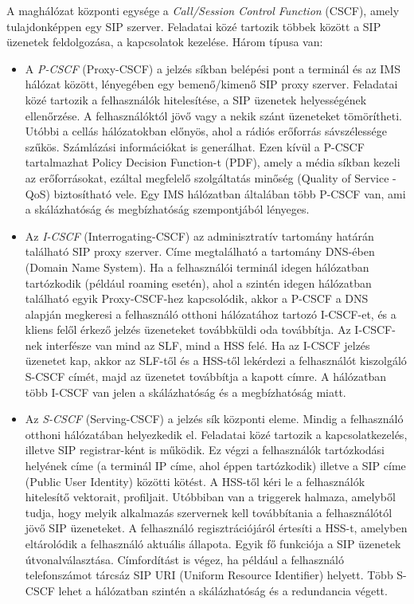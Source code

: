 A maghálózat központi egysége a \emph{Call/Session Control Function} (CSCF), amely tulajdonképpen egy SIP szerver. Feladatai közé tartozik többek között a SIP üzenetek feldolgozása, a kapcsolatok kezelése. Három típusa van:
\begin{itemize}
\item A \emph{P-CSCF} (Proxy-CSCF) a jelzés síkban belépési pont a terminál és az IMS hálózat között, lényegében egy bemenő/kimenő SIP proxy szerver. Feladatai közé tartozik a felhasználók hitelesítése, a SIP üzenetek helyességének ellenőrzése. A felhasználóktól jövő vagy a nekik szánt üzeneteket tömörítheti. Utóbbi a cellás hálózatokban előnyös, ahol a rádiós erőforrás sávszélessége szűkös. Számlázási információkat is generálhat. Ezen kívül a P-CSCF tartalmazhat Policy Decision Function-t (PDF), amely a média síkban kezeli az erőforrásokat, ezáltal megfelelő szolgáltatás minőség (Quality of Service - QoS) biztosítható vele. Egy IMS hálózatban általában több P-CSCF van, ami a skálázhatóság és megbízhatóság szempontjából lényeges.
\item Az \emph{I-CSCF} (Interrogating-CSCF) az adminisztratív tartomány határán található SIP proxy szerver. Címe megtalálható a tartomány DNS-ében (Domain Name System). Ha a felhasználói terminál idegen hálózatban tartózkodik (például roaming esetén), ahol a szintén idegen hálózatban található egyik Proxy-CSCF-hez kapcsolódik, akkor a P-CSCF a DNS alapján megkeresi a felhasználó otthoni hálózatához tartozó I-CSCF-et, és a kliens felől érkező jelzés üzeneteket továbbküldi oda továbbítja. Az I-CSCF-nek interfésze van mind az SLF, mind a HSS felé. Ha az I-CSCF jelzés üzenetet kap, akkor az SLF-től és a HSS-től lekérdezi a felhasználót kiszolgáló S-CSCF címét, majd az üzenetet továbbítja a kapott címre. A hálózatban több I-CSCF van jelen a skálázhatóság és a megbízhatóság miatt.
\item Az \emph{S-CSCF} (Serving-CSCF) a jelzés sík központi eleme. Mindig a felhasználó otthoni hálózatában helyezkedik el. Feladatai közé tartozik a kapcsolatkezelés, illetve SIP registrar-ként is működik. Ez végzi a felhasználók tartózkodási helyének címe (a terminál IP címe, ahol éppen tartózkodik) illetve a SIP címe (Public User Identity) közötti kötést. A HSS-től kéri le a felhasználók hitelesítő vektorait, profiljait. Utóbbiban van a triggerek halmaza, amelyből tudja, hogy melyik alkalmazás szervernek kell továbbítania a felhasználótól jövő SIP üzeneteket. A felhasználó regisztrációjáról értesíti a HSS-t, amelyben eltárolódik a felhasználó aktuális állapota. Egyik fő funkciója a SIP üzenetek útvonalválasztása. Címfordítást is végez, ha például a felhasználó telefonszámot tárcsáz SIP URI (Uniform Resource Identifier) helyett. Több S-CSCF lehet a hálózatban szintén a skálázhatóság és a redundancia végett.
\end{itemize}

